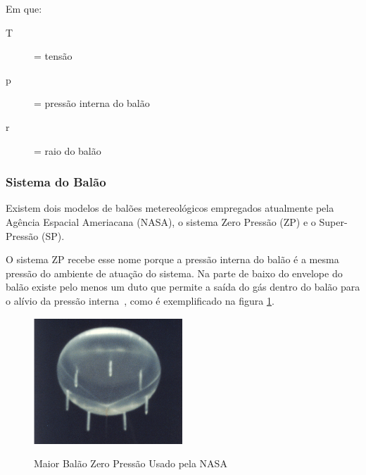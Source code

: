 	Em que:
	\begin{description}
		\item[T] = tensão
		\item[p] = pressão interna do balão
		\item[r] = raio do balão
	\end{description}

\subsubsection{Sistema do Balão}

	Existem dois modelos de balões metereológicos empregados atualmente pela Agência Espacial Ameriacana (NASA), o sistema Zero Pressão (ZP) e o Super-Pressão (SP).

	O sistema ZP recebe esse nome porque a pressão interna do balão é a mesma  pressão do ambiente de atuação do sistema. Na parte de baixo do envelope do balão existe pelo menos um duto que permite a saída do gás dentro do balão para o alívio da pressão interna~\cite{nasa3}, como é exemplificado na figura \ref{img:maiorBalaoZeroPressao}.

	\begin{figure}[htp]
		\centering
		\caption[Maior Balão Zero Pressão Usado pela NASA]{Maior Balão Zero Pressão Usado pela NASA~\cite{nasa1}}
		\includegraphics[width=0.5\textwidth]{figuras/maiorBalaoZeroPressao}
		\label{img:maiorBalaoZeroPressao}
	\end{figure}

